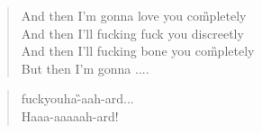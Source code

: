 \documentclass[9pt,a4paper,oneside, onecolumn]{article}
\begin{document}
\begin{multicols}{2}
\begin{verse}
And \Hm{}then I'm gonna love you com\G{}pletely\\
And \D{}then I'll fucking fuck you dis\A{}creetly\\
And \Hm{}then I'll fucking bone you com\G{}pletely\\
But \D{}then I'm gonna ....
\end{verse}

\begin{verse}
\Em{}fuck\quad \A{}you\quad \C{}ha\quad -\quad \G{}aah\quad -\quad \D{}ard...\\
\Hbs{}Haaa\quad -\quad \C{}aaaaah\quad -\quad \D{}ard! \\
\end{verse}

\begin{verse}

\end{verse}

\end{multicols}
\end{document}
